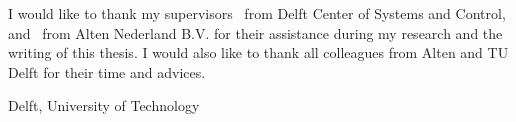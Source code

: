 \documentclass[a4paper,11pt]{mscThesis}
\begin{document}
%
\frontmatter %
%
 \maketitle
%

%
    I would like to thank my supervisors \mscreaderone\ from Delft Center of Systems and Control, and \mscreadertwo\ from Alten Nederland B.V. for their assistance during my research and the writing of this thesis. I would also like to thank all colleagues from Alten and TU Delft for their time and advices.
    \vspace*{15mm}

    \noindent
    Delft, University of Technology \hfill \mscname\\
    \mscdate

%
    \tocloflot
%
    
    \cleardoublepage%
%
%
\mainmatter
%
%
%







%

%


	
\appendix



\backmatter
	
	
	
	
	
	\printindex

	\printnomenclature




\end{document}
